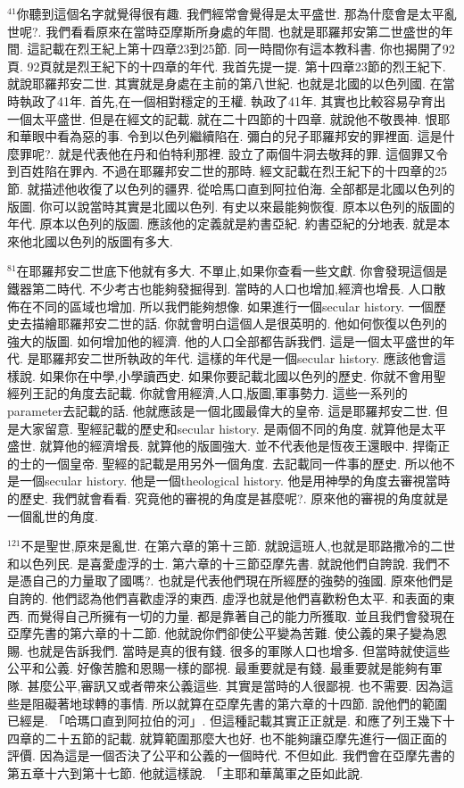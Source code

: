 \documentclass{book}
\begin{document}
$^{41}$你聽到這個名字就覺得很有趣.
我們經常會覺得是太平盛世.
那為什麼會是太平亂世呢?.
我們看看原來在當時亞摩斯所身處的年間.
也就是耶羅邦安第二世盛世的年間.
這記載在烈王紀上第十四章23到25節.
同一時間你有這本教科書.
你也揭開了92頁.
92頁就是烈王紀下的十四章的年代.
我首先提一提.
第十四章23節的烈王紀下.
就說耶羅邦安二世.
其實就是身處在主前的第八世紀.
也就是北國的以色列國.
在當時執政了41年.
首先,在一個相對穩定的王權.
執政了41年.
其實也比較容易孕育出一個太平盛世.
但是在經文的記載.
就在二十四節的十四章.
就說他不敬畏神.
恨耶和華眼中看為惡的事.
令到以色列繼續陷在.
彌白的兒子耶羅邦安的罪裡面.
這是什麼罪呢?.
就是代表他在丹和伯特利那裡.
設立了兩個牛洞去敬拜的罪.
這個罪又令到百姓陷在罪內.
不過在耶羅邦安二世的那時.
經文記載在烈王紀下的十四章的25節.
就描述他收復了以色列的疆界.
從哈馬口直到阿拉伯海.
全部都是北國以色列的版圖.
你可以說當時其實是北國以色列.
有史以來最能夠恢復.
原本以色列的版圖的年代.
原本以色列的版圖.
應該他的定義就是約書亞紀.
約書亞紀的分地表.
就是本來他北國以色列的版圖有多大.

$^{81}$在耶羅邦安二世底下他就有多大.
不單止,如果你查看一些文獻.
你會發現這個是鐵器第二時代.
不少考古也能夠發掘得到.
當時的人口也增加,經濟也增長.
人口散佈在不同的區域也增加.
所以我們能夠想像.
如果進行一個secular history.
一個歷史去描繪耶羅邦安二世的話.
你就會明白這個人是很英明的.
他如何恢復以色列的強大的版圖.
如何增加他的經濟.
他的人口全部都告訴我們.
這是一個太平盛世的年代.
是耶羅邦安二世所執政的年代.
這樣的年代是一個secular history.
應該他會這樣說.
如果你在中學,小學讀西史.
如果你要記載北國以色列的歷史.
你就不會用聖經列王記的角度去記載.
你就會用經濟,人口,版圖,軍事勢力.
這些一系列的parameter去記載的話.
他就應該是一個北國最偉大的皇帝.
這是耶羅邦安二世.
但是大家留意.
聖經記載的歷史和secular history.
是兩個不同的角度.
就算他是太平盛世.
就算他的經濟增長.
就算他的版圖強大.
並不代表他是恆夜王還眼中.
捍衛正的士的一個皇帝.
聖經的記載是用另外一個角度.
去記載同一件事的歷史.
所以他不是一個secular history.
他是一個theological history.
他是用神學的角度去審視當時的歷史.
我們就會看看.
究竟他的審視的角度是甚麼呢?.
原來他的審視的角度就是一個亂世的角度.

$^{121}$不是聖世,原來是亂世.
在第六章的第十三節.
就說這班人,也就是耶路撒冷的二世和以色列民.
是喜愛虛浮的士.
第六章的十三節亞摩先書.
就說他們自誇說.
我們不是憑自己的力量取了國嗎?.
也就是代表他們現在所經歷的強勢的強國.
原來他們是自誇的.
他們認為他們喜歡虛浮的東西.
虛浮也就是他們喜歡粉色太平.
和表面的東西.
而覺得自己所擁有一切的力量.
都是靠著自己的能力所獲取.
並且我們會發現在亞摩先書的第六章的十二節.
他就說你們卻使公平變為苦難.
使公義的果子變為恩賜.
也就是告訴我們.
當時是真的很有錢.
很多的軍隊人口也增多.
但當時就使這些公平和公義.
好像苦膽和恩賜一樣的鄙視.
最重要就是有錢.
最重要就是能夠有軍隊.
甚麼公平,審訊又或者帶來公義這些.
其實是當時的人很鄙視.
也不需要.
因為這些是阻礙著地球轉的事情.
所以就算在亞摩先書的第六章的十四節.
說他們的範圍已經是.
「哈瑪口直到阿拉伯的河」.
但這種記載其實正正就是.
和應了列王幾下十四章的二十五節的記載.
就算範圍那麼大也好.
也不能夠讓亞摩先進行一個正面的評價.
因為這是一個否決了公平和公義的一個時代.
不但如此.
我們會在亞摩先書的第五章十六到第十七節.
他就這樣說.
「主耶和華萬軍之臣如此說.
\end{document}
